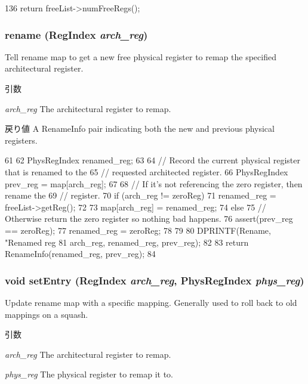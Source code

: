 \begin{DoxyCode}
136 { return freeList->numFreeRegs(); }
\end{DoxyCode}
\hypertarget{classSimpleRenameMap_a18370a31dd17baa3a67d1ce3e0f43885}{
\subsubsection[{rename}]{ rename ({\bf RegIndex} {\em arch\_\-reg})}}
\label{classSimpleRenameMap_a18370a31dd17baa3a67d1ce3e0f43885}
Tell rename map to get a new free physical register to remap the specified architectural register. 
\begin{DoxyParams}{引数}
\item[{\em arch\_\-reg}]The architectural register to remap. \end{DoxyParams}
\begin{DoxyReturn}{戻り値}
A RenameInfo pair indicating both the new and previous physical registers. 
\end{DoxyReturn}



\begin{DoxyCode}
61 {
62     PhysRegIndex renamed_reg;
63 
64     // Record the current physical register that is renamed to the
65     // requested architected register.
66     PhysRegIndex prev_reg = map[arch_reg];
67 
68     // If it's not referencing the zero register, then rename the
69     // register.
70     if (arch_reg != zeroReg) {
71         renamed_reg = freeList->getReg();
72 
73         map[arch_reg] = renamed_reg;
74     } else {
75         // Otherwise return the zero register so nothing bad happens.
76         assert(prev_reg == zeroReg);
77         renamed_reg = zeroReg;
78     }
79 
80     DPRINTF(Rename, "Renamed reg %
81             arch_reg, renamed_reg, prev_reg);
82 
83     return RenameInfo(renamed_reg, prev_reg);
84 }
\end{DoxyCode}
\hypertarget{classSimpleRenameMap_a5c6cad04be83122ff38650d859fbf1d8}{
\subsubsection[{setEntry}]{\setlength{\rightskip}{0pt plus 5cm}void setEntry ({\bf RegIndex} {\em arch\_\-reg}, \/  {\bf PhysRegIndex} {\em phys\_\-reg})}}
\label{classSimpleRenameMap_a5c6cad04be83122ff38650d859fbf1d8}
Update rename map with a specific mapping. Generally used to roll back to old mappings on a squash. 
\begin{DoxyParams}{引数}
\item[{\em arch\_\-reg}]The architectural register to remap. \item[{\em phys\_\-reg}]The physical register to remap it to. \end{DoxyParams}



